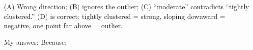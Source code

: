 \documentclass[10pt]{article}
\begin{document}
\begin{teachernote}
(A) Wrong direction; (B) ignores the outlier; (C) ``moderate'' contradicts ``tightly clustered.''
(D) is correct: tightly clustered = strong, sloping downward = negative, one point far above = outlier.
\end{teachernote}

\vspace{0.1in}
\noindent\textcolor{slate}{\small My answer:  \quad Because: }
\end{document}

